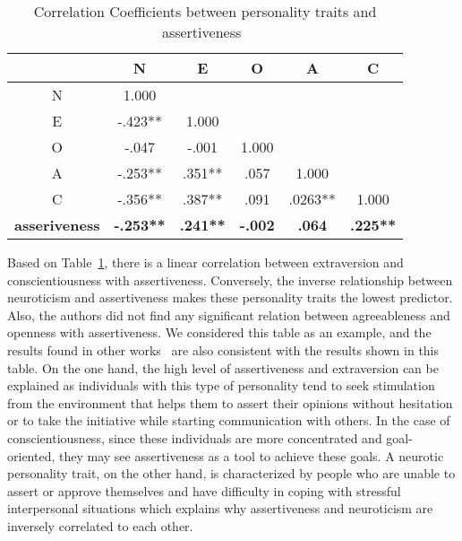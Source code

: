 \begin{table} [h]
    \centering
    \begin{tabular}{c c c c c c}
        \\
        \hline \hline
        & \textbf{N}            &\textbf{E}        &\textbf{O}        &\textbf{A}        &\textbf{C}    \\ [0.5ex]
        \hline
        N & 1.000 & & & &    \\
        E & -.423** &1.000 & & &    \\
        O & -.047 &-.001 &1.000 & &    \\
        A & -.253** &.351** &.057 &1.000 &    \\
        C & -.356** &.387** &.091 &.0263** &1.000    \\ [1ex]
        \hline
        \textbf{asseriveness}        & \textbf{-.253**}        &\textbf{.241**}    &\textbf{-.002}        &\textbf{.064}        &\textbf{.225**}    \\
        \hline \hline
    \end{tabular}
    \caption[]{Correlation Coefficients between personality traits and assertiveness~\cite{bagherian2016relationship}\footnotemark}
    \label{table:assertiveness}
\end{table}

Based on Table~\ref{table:assertiveness}, there is a linear correlation between
extraversion and conscientiousness with assertiveness.
Conversely, the inverse relationship between neuroticism and assertiveness
makes these personality traits the lowest predictor.
Also, the authors did not find any significant relation between agreeableness and openness with assertiveness.
We considered this table as an example, and the results found in other
works~\cite{kirst2011investigating,ramanaiah1993neo,lefevre1981assertiveness} are
also consistent with the results shown in this table.
On the one hand, the high level of assertiveness and extraversion can be explained
as individuals with this type of personality tend to seek stimulation from the environment
that helps them to assert their opinions without hesitation or to take
the initiative while starting communication with others.
In the case of conscientiousness, since these individuals are more
concentrated and goal-oriented, they may see assertiveness as a tool to achieve these goals.
A neurotic personality trait, on the other hand, is characterized
by people who are unable to assert or approve themselves and have difficulty in coping with stressful
interpersonal situations which explains why assertiveness and neuroticism are inversely correlated to each other.

